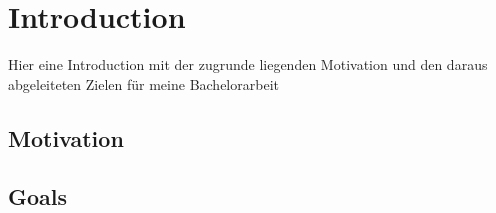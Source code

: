 
\chapter{Introduction} %

\label{Introduction} %


\newcommand{\keyword}[1]{\textbf{#1}}
\newcommand{\tabhead}[1]{\textbf{#1}}
\newcommand{\code}[1]{\texttt{#1}}
\newcommand{\file}[1]{\texttt{\bfseries#1}}
\newcommand{\option}[1]{\texttt{\itshape#1}}

\begin{text}
Hier eine Introduction mit der zugrunde liegenden Motivation und den daraus abgeleiteten Zielen für meine Bachelorarbeit
\end{text}
\section{Motivation}

\section{Goals} \label{Goals}